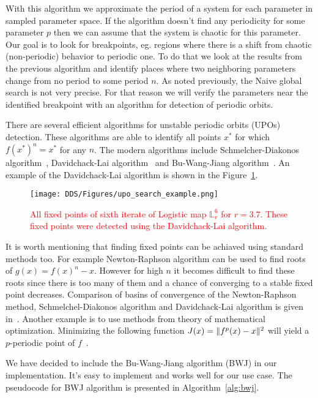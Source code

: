 With this algorithm we approximate the period of a system for each parameter in sampled parameter space.
If the algorithm doesn't find any periodicity for some parameter $p$ then we can assume that the system is chaotic for this parameter.
Our goal is to look for breakpoints, eg. regions where there is a shift from chaotic (non-periodic) behavior to periodic one.
To do that we look at the results from the previous algorithm and identify places where two neighboring parameters change from no period to some period $n$.
As noted previously, the Naive global search is not very precise. For that reason we will verify the parameters near the identified breakpoint with an algorithm for detection of periodic orbits.
\par
There are several efficient algorithms for unstable periodic orbits (UPOs) detection.
These algorithms are able to identify all points $x^{*}$ for which $f(x^{*})^{n}=x^{*}$ for any $n$.
The modern algorithms include Schmelcher-Diakonos algorithm~\cite{Schmelcher1997}, Davidchack-Lai algorithm~\cite{Davidchack1999,Davidchack2001,Klebanoff2001} and Bu-Wang-Jiang algorithm~\cite{Bu2004}.
An example of the Davidchack-Lai algorithm is shown in the Figure~\ref{fig:upo_search_example}.

\begin{figure}[!h]
    \centering
    \texttt{[image: DDS/Figures/upo\_search\_example.png]}
    \caption{
        \textcolor{red}{
        All fixed points of sixth iterate of Logistic map $\mathbb{L}_{r}^{6}$ for $r = 3.7$.
        These fixed points were detected using the Davidchack-Lai algorithm.
        }
    }
    \label{fig:upo_search_example}
\end{figure}

\par
It is worth mentioning that finding fixed points can be achiaved using standard methods too.
For example Newton-Raphson algorithm can be used to find roots of $g(x) = f(x)^{n} - x$.
However for high $n$ it becomes difficult to find these roots since there is too many of them and a chance of converging to a stable fixed point decreases.
Comparison of basins of convergence of the Newton-Raphson method, Schmelchel-Diakonos algorithm and Davidchack-Lai algorithm is given in~\cite{Davidchack1999}.
Another example is to use methods from theory of mathematical optimization.
Minimizing the following function $J(x)= \lVert f^{p}(x)-x\rVert^{2}$ will yield a $p$-periodic point of $f$~\cite{Fuh2009}.
\par
We have decided to include the Bu-Wang-Jiang algorithm (BWJ) in our implementation.
It's easy to implement and works well for our use case.
The pseudocode for BWJ algorithm is presented in Algorithm~\ref{alg:bwj}.

